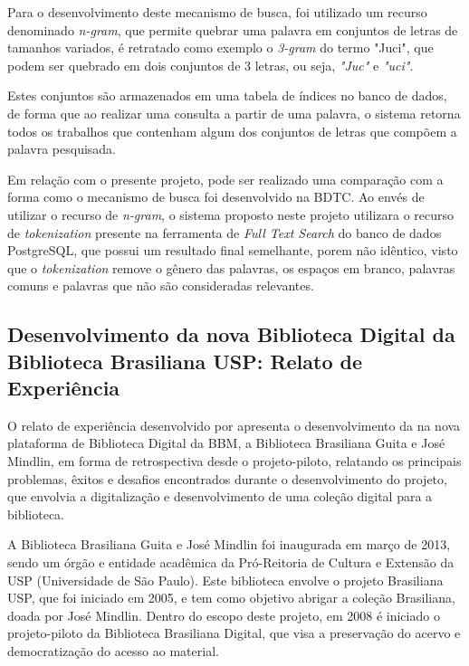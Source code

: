 Para o desenvolvimento deste mecanismo de busca, foi utilizado
um recurso denominado \emph{n-gram}, que permite quebrar uma palavra em
conjuntos de letras de tamanhos variados, é retratado como exemplo o
\emph{3-gram} do termo "Juci", que podem ser quebrado em dois conjuntos de 3
letras, ou seja, \emph{"Juc"} e \emph{"uci"}.

Estes conjuntos são armazenados em uma tabela de índices no banco de
dados, de forma que ao realizar uma consulta a partir de uma palavra,
o sistema retorna todos os trabalhos que contenham algum dos conjuntos
de letras que compõem a palavra pesquisada.

Em relação com o presente projeto, pode ser realizado uma comparação com
a forma como o mecanismo de busca foi desenvolvido na BDTC. Ao envés de
utilizar o recurso de \emph{n-gram}, o sistema proposto neste projeto utilizara
o recurso de \emph{tokenization} presente na ferramenta de \emph{Full Text Search} do
banco de dados PostgreSQL, que possui um resultado final semelhante, porem não
idêntico, visto que o \emph{tokenization} remove o gênero das palavras,
os espaços em branco, palavras comuns e palavras que não são consideradas relevantes.

\subsection{Desenvolvimento da nova Biblioteca Digital da Biblioteca Brasiliana USP: Relato de Experiência}

O relato de experiência desenvolvido por \cite{GarciaRodrigoMoreira2019DdnB}
apresenta o desenvolvimento da na nova plataforma de Biblioteca Digital da
BBM, a Biblioteca Brasiliana Guita e José Mindlin, em forma de retrospectiva
desde o projeto-piloto, relatando os principais problemas, êxitos
e desafios encontrados durante o desenvolvimento do projeto, que envolvia
a digitalização e desenvolvimento de uma coleção digital para a biblioteca.

A Biblioteca Brasiliana Guita e José Mindlin foi inaugurada em março
de 2013, sendo um órgão e entidade acadêmica da Pró-Reitoria de Cultura
e Extensão da USP (Universidade de São Paulo). Este biblioteca envolve o
projeto Brasiliana USP, que foi iniciado em 2005, e tem como objetivo
abrigar a coleção Brasiliana, doada por José Mindlin. Dentro do escopo
deste projeto, em 2008 é iniciado o projeto-piloto da Biblioteca
Brasiliana Digital, que visa a preservação do acervo e democratização
do acesso ao material.

